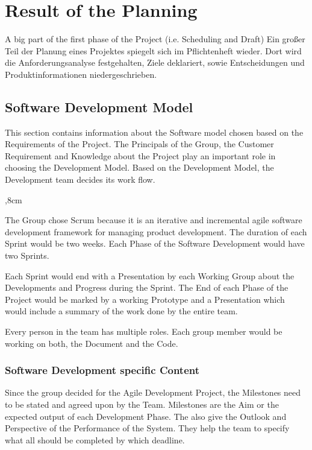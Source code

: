 \section{Result of the Planning}
A big part of the first phase of the Project (i.e. Scheduling and Draft) 
Ein großer Teil der Planung eines Projektes spiegelt sich im Pflichtenheft wieder. Dort wird die Anforderungsanalyse festgehalten, Ziele deklariert, sowie Entscheidungen und Produktinformationen niedergeschrieben.

\subsection{Software Development Model}

This section contains information about the Software model chosen based on the Requirements of the Project.
The Principals of the Group, the Customer Requirement and Knowledge about the Project play an important role in choosing the Development Model. Based on the Development Model, the Development team decides its work flow. 

\begin{description}
	,8cm
	\item[Agile Development Model: SCRUM] The Group chose Scrum because it is an iterative and incremental agile software development framework for managing product development. The duration of each Sprint would be two weeks. Each Phase of the Software Development would have two Sprints. 
	
	Each Sprint would end with a Presentation by each Working Group about the Developments and Progress during the Sprint. The End of each Phase of the Project would be marked by a working Prototype and a Presentation which would include a summary of the work done by the entire team. 
	
	\item[Projects specific Adaptation to the Model:] Every person in the team has multiple roles. Each group member would be working on both, the Document and the Code.
\end{description} 

\subsubsection{Software Development specific Content}
Since the group decided for the Agile Development Project, the Milestones need to be stated and agreed upon by the Team. Milestones are the Aim or the expected output of each Development Phase. The also give the Outlook and Perspective of the Performance of the System. They help the team to specify what all should be completed by which deadline.

